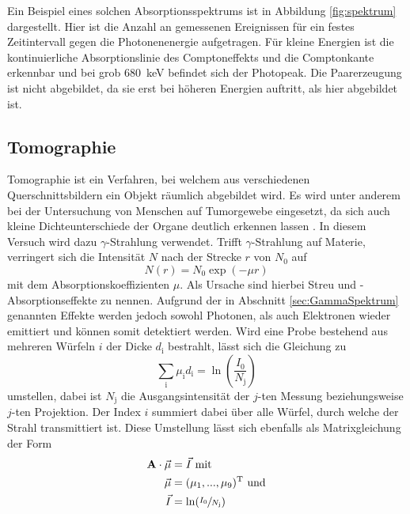 Ein Beispiel eines solchen Absorptionsspektrums ist in Abbildung \ref{fig:spektrum}
dargestellt. Hier ist die Anzahl an gemessenen Ereignissen für ein
festes Zeitintervall gegen die Photonenenergie aufgetragen.
Für kleine Energien ist die kontinuierliche Absorptionslinie des Comptoneffekts
und die Comptonkante erkennbar und bei grob \SI{680}{\kilo\electronvolt}
befindet sich der Photopeak. Die Paarerzeugung ist nicht abgebildet,
da sie erst bei höheren Energien auftritt, als hier abgebildet ist.


\subsection{Tomographie}
\label{sec:Tomographie}

Tomographie ist ein Verfahren, bei welchem aus verschiedenen
Querschnittsbildern ein Objekt räumlich abgebildet wird.
Es wird unter anderem bei der Untersuchung von Menschen auf Tumorgewebe eingesetzt,
da sich auch kleine Dichteunterschiede der Organe deutlich erkennen lassen \cite{paradisi}.
In diesem Versuch wird dazu $\gamma$-Strahlung verwendet.
Trifft $\gamma$-Strahlung auf Materie, verringert sich die Intensität $N$
nach der Strecke $r$ von $N_0$ auf
\begin{equation*}
  N\left(r\right) = N_0 \exp\left(-\mu r\right)
\end{equation*}
mit dem Absorptionskoeffizienten $\mu$.
Als Ursache sind hierbei Streu und -Absorptionseffekte zu nennen.
Aufgrund der in Abschnitt \ref{sec:GammaSpektrum} genannten Effekte werden
jedoch sowohl Photonen, als auch Elektronen wieder emittiert und können
somit detektiert werden.
Wird eine Probe bestehend aus
mehreren Würfeln $i$ der Dicke $d_\text{i}$ bestrahlt, lässt sich
die Gleichung zu
\begin{equation*}
  \sum_\text{i} \mu_\text{i} d_\text{i} = \ln\left(\frac{I_0}{N_\text{j}}\right)
\end{equation*}
umstellen, dabei ist $N_\text{j}$ die Ausgangsintensität der $j$-ten Messung
beziehungsweise $j$-ten Projektion.
Der Index $i$ summiert dabei über alle Würfel, durch welche der Strahl
transmittiert ist.
Diese Umstellung lässt sich ebenfalls als Matrixgleichung der
Form
\begin{equation}
  \begin{aligned}
    \mathbf{A} \cdot \vec{\mu} &= \vec{I} \text{ mit} \\
    \vec{\mu} &= (\mu_1,...,\mu_9)^\text{T} \text{ und} \\
    \vec{I} &= \ln(\sfrac{I_0}{N_\text{j}})
  \end{aligned}
  \label{eqn:matrixform}
\end{equation}
